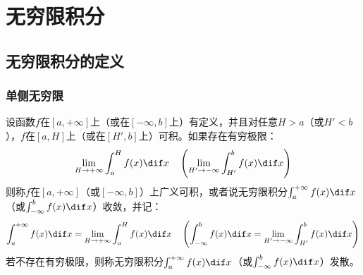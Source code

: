 \section{无穷限积分}

\subsection{无穷限积分的定义}
\subsubsection{单侧无穷限}
\begin{definition}
	设函数$f$在$[a,+\infty]$上（或在$[-\infty,b]$上）有定义，并且对任意$H>a$（或$H'<b$），$f$在$[a,H]$上（或在$[H',b]$上）可积。如果存在有穷极限：
	\begin{equation*}
		\lim_{H\to+\infty}\int_{a}^{H}f(x)\dif x\quad
		\left(\lim_{H'\to-\infty}\int_{H'}^{b}f(x)\dif x\right)
	\end{equation*}
	则称$f$在$[a,+\infty]$（或$[-\infty,b]$）上广义可积，或者说无穷限积分$\int_{a}^{+\infty}f(x)\dif x$（或$\int_{-\infty}^{b}f(x)\dif x$）收敛，并记：
	\begin{equation*}
		\int_{a}^{+\infty}f(x)\dif x=\lim_{H\to+\infty}\int_{a}^{H}f(x)\dif x\quad
		\left(\int_{-\infty}^{b}f(x)\dif x=\lim_{H'\to-\infty}\int_{H'}^{b}f(x)\dif x\right)
	\end{equation*}
	若不存在有穷极限，则称无穷限积分$\int_{a}^{+\infty}f(x)\dif x$（或$\int_{-\infty}^{b}f(x)\dif x$）发散。
\end{definition}
